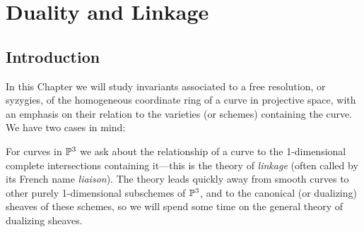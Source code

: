               

\chapter{Duality and Linkage}
\label{DualityChapter}


%
%
%
%
%
%
%
%
\def\length{{\rm length}}
\section{Introduction} 
%
%


In this Chapter we will study  invariants associated to a free resolution, or syzygies, of the homogeneous coordinate ring of a curve in projective space, with an emphasis on their relation to the varieties (or schemes) containing the curve. We have two cases in mind:

For curves in ${\mathbb P}^{3}$ we ask about the relationship of a curve to the 1-dimensional complete intersections containing it---this is the theory of \emph{linkage} (often called by its French name \emph{liaison}). The theory leads quickly away from smooth curves to other purely 1-dimensional subschemes of ${\mathbb P}^{3}$, and to the canonical (or dualizing) sheaves of these schemes, so we will spend some time on the general theory of dualizing sheaves.


